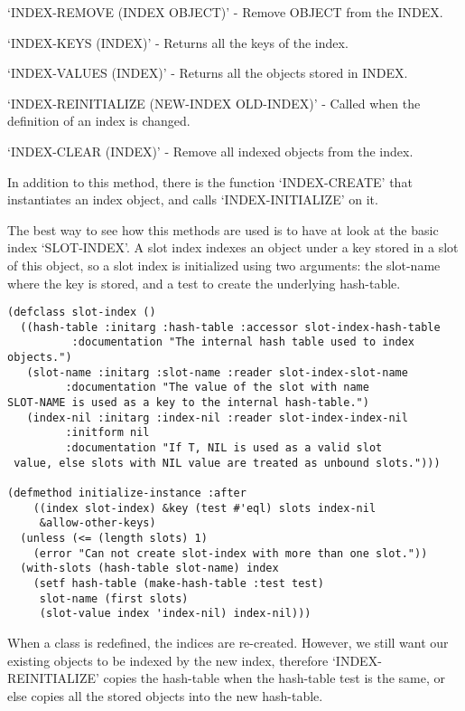 `INDEX-REMOVE (INDEX OBJECT)' - Remove OBJECT from the INDEX.

`INDEX-KEYS (INDEX)' - Returns all the keys of the index.

`INDEX-VALUES (INDEX)' - Returns all the objects stored in INDEX.

`INDEX-REINITIALIZE (NEW-INDEX OLD-INDEX)' - Called when the
definition of an index is changed.

`INDEX-CLEAR (INDEX)' - Remove all indexed objects from the index.

In addition to this method, there is the function `INDEX-CREATE'
that instantiates an index object, and calls `INDEX-INITIALIZE' on
it.

The best way to see how this methods are used is to have at look
at the basic index `SLOT-INDEX'. A slot index indexes an object
under a key stored in a slot of this object, so a slot index is
initialized using two arguments: the slot-name where the key is
stored, and a test to create the underlying hash-table.

\begin{Verbatim}[fontsize=\small,frame=leftline,framerule=0.9mm,rulecolor=\color{gray},framesep=5.1mm,xleftmargin=5mm,fontfamily=cmtt]
(defclass slot-index ()
  ((hash-table :initarg :hash-table :accessor slot-index-hash-table
          :documentation "The internal hash table used to index
objects.")
   (slot-name :initarg :slot-name :reader slot-index-slot-name
         :documentation "The value of the slot with name
SLOT-NAME is used as a key to the internal hash-table.")
   (index-nil :initarg :index-nil :reader slot-index-index-nil
         :initform nil
         :documentation "If T, NIL is used as a valid slot
 value, else slots with NIL value are treated as unbound slots.")))

(defmethod initialize-instance :after
    ((index slot-index) &key (test #'eql) slots index-nil
     &allow-other-keys)
  (unless (<= (length slots) 1)
    (error "Can not create slot-index with more than one slot."))
  (with-slots (hash-table slot-name) index
    (setf hash-table (make-hash-table :test test)
     slot-name (first slots)
     (slot-value index 'index-nil) index-nil)))
\end{Verbatim}
When a class is redefined, the indices are re-created. However, we
still want our existing objects to be indexed by the new index,
therefore `INDEX-REINITIALIZE' copies the hash-table when the
hash-table test is the same, or else copies all the stored objects
into the new hash-table.

